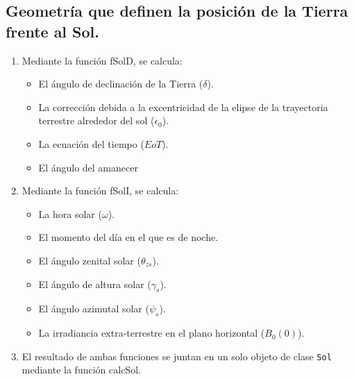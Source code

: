\subsection{Geometría que definen la posición de la Tierra frente al Sol.}
\label{sec:orgfe90ba5}
\begin{enumerate}
\item Mediante la función fSolD, se calcula:
\begin{itemize}
\item El ángulo de declinación de la Tierra (\(\delta\)).
\item La corrección debida a la excentricidad de la elipse de la trayectoria terrestre alrededor del sol (\(\epsilon_0\)).
\item La ecuación del tiempo (\(EoT\)).
\item El ángulo del amanecer
\end{itemize}
\item Mediante la función fSolI, se calcula:
\begin{itemize}
\item La hora solar (\(\omega\)).
\item El momento del día en el que es de noche.
\item El ángulo zenital solar (\(\theta_{zs}\)).
\item El ángulo de altura solar (\(\gamma_s\)).
\item El ángulo azimutal solar (\(\psi_s\)).
\item La irradiancia extra-terrestre en el plano horizontal (\(B_0(0)\)).
\end{itemize}
\item El resultado de ambas funciones se juntan en un solo objeto de clase \texttt{Sol} mediante la función calcSol.
\end{enumerate}
